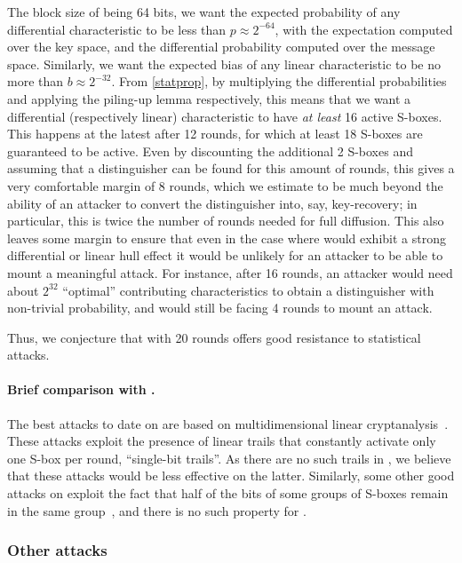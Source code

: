 The block size of \fly being 64 bits, we want
the expected probability of any differential characteristic to be less than 
$p \approx 2^{-64}$,  with the expectation computed over the key space, and the differential probability computed over the message space.
Similarly, we want the expected bias of any linear characteristic to be no more than $b \approx 2^{-32}$. From
\autoref{statprop}, by multiplying the differential probabilities and applying the piling-up lemma respectively, this means that we want a differential
(respectively linear) characteristic to have \emph{at least} 16 active S-boxes. This happens at the latest after 12 rounds, for which at least 18 S-boxes are guaranteed to be active.
Even by discounting the additional 2 S-boxes and assuming that a distinguisher can be found for this amount of rounds, this gives a very comfortable margin of 8 rounds,
which we estimate to be much beyond the ability of an attacker to convert the distinguisher into, say, key-recovery; in particular, this is twice the number of rounds needed
for full diffusion.
This also leaves some margin to ensure that even in the case where \fly would exhibit a strong differential or linear hull effect it would be unlikely for an attacker to be able
to mount a meaningful attack. For instance, after 16 rounds, an attacker would need about $2^{32}$ ``optimal'' contributing characteristics to obtain a distinguisher with non-trivial
probability, and would still be facing 4 rounds to mount an attack.

Thus, we conjecture that \fly with 20 rounds offers good resistance to statistical attacks.

\paragraph{Brief comparison with \present.}
The best attacks to date on \present are based on multidimensional linear cryptanalysis~\cite{DBLP:conf/ctrsa/Cho10,DBLP:journals/iacr/BogdanovTV16}. These attacks exploit the presence of linear trails
that constantly activate only one S-box per round, \ie ``single-bit trails''. As there are no such trails in \fly, we believe that these attacks would be less effective
on the latter. Similarly, some other good attacks on \present exploit the fact that half of the bits of some groups of S-boxes remain in the same group~\cite{DBLP:conf/ctrsa/CollardS09},
and there is no such property for \fly.

\subsubsection{Other attacks}

